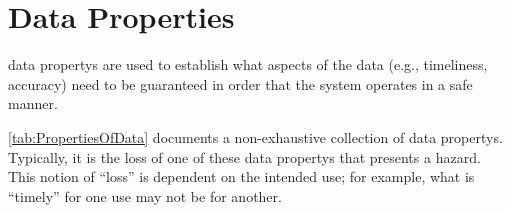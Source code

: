 %
%
\chapter{Data Properties}\label{bkm:dataProperties}


\Glspl{data property} are used to establish what aspects of the data (e.g., \gls{timeliness}, \gls{accuracy}) need to be guaranteed in order that the system operates in a safe manner.

\autoref{tab:PropertiesOfData} documents a non-exhaustive collection of \glspl{data property}. Typically, it is the loss of one of these \glspl{data property} that presents a \gls{hazard}. This notion of ``loss'' is dependent on the intended use; for example, what is ``timely'' for one use may not be for another.

